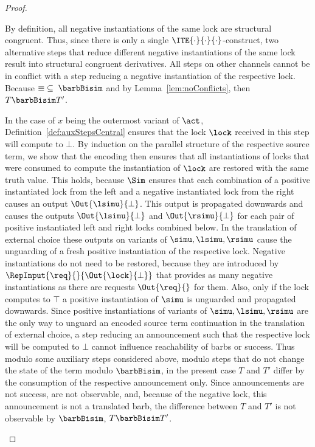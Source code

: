 \documentclass[]{eptcs}
\begin{document}
\begin{proof}
\begin{compactenum}
			By definition, all negative instantiations of the same lock are structural congruent. Thus, since there is only a single $ \ITE{\cdot}{\cdot}{\cdot} $-construct, two alternative steps that reduce different negative instantiations of the same lock result into structural congruent derivatives. All steps on other channels cannot be in conflict with a step reducing a negative instantiation of the respective lock. Because $ \equiv \; \subseteq \; \barbBisim $ and by Lemma~\ref{lem:noConflicts}, then $ T \barbBisim T' $.
		\item In the case of $ x $ being the outermost variant of $ \act $, Definition~\ref{def:auxStepsCentral} ensures that the lock $ \lock $ received in this step will compute to $ \bot $. By induction on the parallel structure of the respective source term, we show that the encoding then ensures that all instantiations of locks that were consumed to compute the instantiation of $ \lock $ are restored with the same truth value. This holds, because $ \Sim $ ensures that each combination of a positive instantiated lock from the left and a negative instantiated lock from the right causes an output $ \Out{\lsimu}{\bot} $. This output is propagated downwards and causes the outputs $ \Out{\lsimu}{\bot} $ and $ \Out{\rsimu}{\bot} $ for each pair of positive instantiated left and right locks combined below. In the translation of external choice these outputs on variants of $ \simu, \lsimu, \rsimu $ cause the unguarding of a fresh positive instantiation of the respective lock. Negative instantiations do not need to be restored, because they are introduced by $ \RepInput{\req}{}{\Out{\lock}{\bot}} $ that provides as many negative instantiations as there are requests $ \Out{\req}{} $ for them.
			Also, only if the lock computes to $ \top $ a positive instantiation of $ \simu $ is unguarded and propagated downwards. Since positive instantiations of variants of $ \simu, \lsimu, \rsimu $ are the only way to unguard an encoded source term continuation in the translation of external choice, a step reducing an announcement such that the respective lock will be computed to $ \bot $ cannot influence reachability of barbs or success.
			Thus modulo some auxiliary steps considered above, \ie modulo steps that do not change the state of the term modulo $ \barbBisim $, in the present case $ T $ and $ T' $ differ by the consumption of the respective announcement only. Since announcements are not success, are not observable, and, because of the negative lock, this announcement is not a translated barb, the difference between $ T $ and $ T' $ is not observable by $ \barbBisim $, \ie $ T \barbBisim T' $.
	\end{compactenum}
\end{proof}
\end{document}
